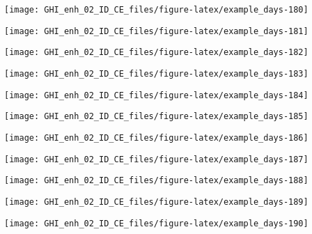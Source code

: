 \documentclass[
  10pt,
  a4paper,oneside]{article}
\begin{document}
\begin{center}\texttt{[image: GHI\_enh\_02\_ID\_CE\_files/figure-latex/example\_days-180]} \end{center}

\begin{center}\texttt{[image: GHI\_enh\_02\_ID\_CE\_files/figure-latex/example\_days-181]} \end{center}

\begin{center}\texttt{[image: GHI\_enh\_02\_ID\_CE\_files/figure-latex/example\_days-182]} \end{center}

\begin{center}\texttt{[image: GHI\_enh\_02\_ID\_CE\_files/figure-latex/example\_days-183]} \end{center}

\begin{center}\texttt{[image: GHI\_enh\_02\_ID\_CE\_files/figure-latex/example\_days-184]} \end{center}

\begin{center}\texttt{[image: GHI\_enh\_02\_ID\_CE\_files/figure-latex/example\_days-185]} \end{center}

\begin{center}\texttt{[image: GHI\_enh\_02\_ID\_CE\_files/figure-latex/example\_days-186]} \end{center}

\begin{center}\texttt{[image: GHI\_enh\_02\_ID\_CE\_files/figure-latex/example\_days-187]} \end{center}

\begin{center}\texttt{[image: GHI\_enh\_02\_ID\_CE\_files/figure-latex/example\_days-188]} \end{center}

\begin{center}\texttt{[image: GHI\_enh\_02\_ID\_CE\_files/figure-latex/example\_days-189]} \end{center}

\begin{center}\texttt{[image: GHI\_enh\_02\_ID\_CE\_files/figure-latex/example\_days-190]} \end{center}
\end{document}
